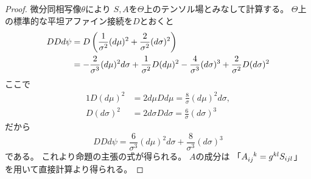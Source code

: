 \documentclass[report]{jlreq}
\begin{document}
\begin{proof}
    微分同相写像$\theta$により
    $S, A$を$\Theta$上のテンソル場とみなして計算する。
    $\Theta$上の標準的な平坦アファイン接続を$D$とおくと
    \begin{alignat}{1}
        DDd\psi
            &=
                D \left({
                    \frac{1}{\sigma^2} (d\mu)^2
                    + \frac{2}{\sigma^2} (d\sigma)^2
                }\right)
                \\
            &=
                - \frac{2}{\sigma^3} (d\mu)^2 d\sigma
                + \frac{1}{\sigma^2} D(d\mu)^2
                - \frac{4}{\sigma^3} (d\sigma)^3
                + \frac{2}{\sigma^2} D(d\sigma)^2
    \end{alignat}
    ここで
    \begin{alignat}{1}
        D(d\mu)^2
            &=
                2 d\mu Dd\mu
            =
                \frac{8}{\sigma} (d\mu)^2 d\sigma,
                \\
        D(d\sigma)^2
            &=
                2 d\sigma Dd\sigma
            =
                \frac{6}{\sigma} (d\sigma)^3
    \end{alignat}
    だから
    \begin{equation}
        DDd\psi
            =
                \frac{6}{\sigma^3} (d\mu)^2 d\sigma
                + \frac{8}{\sigma^3} (d\sigma)^3
    \end{equation}
    である。
    これより命題の主張の式が得られる。
    $A$の成分は
    「$A_{ij}^{\hphantom{ij}k} = g^{kl} S_{ijl}$」
    を用いて直接計算より得られる。
\end{proof}
\end{document}
